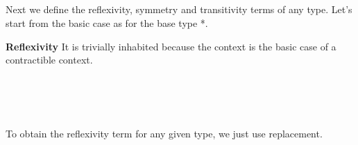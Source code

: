 \begin{code}\>\<%
\\
\> \<[9]%
\>[9]\AgdaSymbol{:}  \AgdaSymbol{\}(} \AgdaSymbol{:}  \AgdaSymbol{)(} \AgdaSymbol{:}  \AgdaSymbol{)}   \<%
\\
\>[0]\<[9]%
\>[9]  \AgdaSymbol{(}  \AgdaSymbol{)}\<%
\\
\> \AgdaSymbol{\{\_\}} \AgdaSymbol{\{}\AgdaSymbol{\}}  \AgdaSymbol{\_}  \AgdaSymbol{=}  \AgdaSymbol{(}  \AgdaSymbol{)} \AgdaSymbol{\_} \AgdaSymbol{\_}\<%
\\
\>\<\end{code}
Next we define the reflexivity, symmetry and transitivity terms of any type. Let's start from the basic case as for the base type *.

\noindent \textbf{Reflexivity} It is trivially inhabited because the context is the basic case of a contractible context.

\begin{code}\>\<%
\\
\> \AgdaSymbol{:}  \AgdaSymbol{\{}\AgdaSymbol{\}} \AgdaSymbol{(}    \AgdaSymbol{)}\<%
\\
\> \AgdaSymbol{=}  \<%
\\
\>\<\end{code}
\noindent To obtain the reflexivity term for any given type, we just  use replacement.


